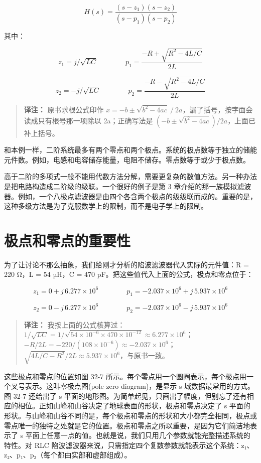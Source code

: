 \[H(s) = \frac{(s - z_1)(s - z_2)}{(s - p_1)(s - p_2)}\]

其中：

\[z_1 = j/\sqrt{LC} \qquad\qquad p_1 = \frac{-R + \sqrt{R^2 - 4L/C}}{2L}\]

\[z_2 = -j/\sqrt{LC} \qquad\qquad p_2 = \frac{-R - \sqrt{R^2 - 4L/C}}{2L}\]

\begin{quote}
\textbf{译注：} 原书求根公式印作
\(x = -b \pm \sqrt{b^2 - 4ac}\ /\ 2a\)，漏了括号，按字面会读成只有根号那一项除以
2a；正确写法是 \((-b \pm \sqrt{b^2-4ac})/2a\)，上面已补上括号。
\end{quote}

和本例一样，二阶系统最多有两个零点和两个极点。系统的极点数等于独立的储能元件数。例如，电感和电容储存能量，电阻不储存。零点数等于或少于极点数。

高于二阶的多项式一般不能用代数方法分解，需要更复杂的数值方法。另一种办法是把电路构造成二阶级的级联。一个很好的例子是第
3
章介绍的那一族模拟滤波器。例如，一个八极点滤波器是由四个各含两个极点的级级联而成的。重要的是，这种多级方法是为了克服数学上的限制，而不是电子学上的限制。

\section{极点和零点的重要性}

为了让讨论不那么抽象，我们给刚才分析的陷波滤波器代入实际的元件值：R =
220 Ω，L = 54 µH，C = 470 pF。把这些值代入上面的公式，极点和零点位于：

\[z_1 = 0 + j\,6.277\times 10^6 \qquad\qquad p_1 = -2.037\times 10^6 + j\,5.937\times 10^6\]

\[z_2 = 0 - j\,6.277\times 10^6 \qquad\qquad p_2 = -2.037\times 10^6 - j\,5.937\times 10^6\]

\begin{quote}
\textbf{译注：}
我按上面的公式核算过：\(1/\sqrt{LC} = 1/\sqrt{54\times10^{-6}\times 470\times10^{-12}} \approx 6.277\times10^6\)；\(-R/2L = -220/(108\times10^{-6}) \approx -2.037\times10^6\)；\(\sqrt{4L/C - R^2}/2L \approx 5.937\times10^6\)，与原书一致。
\end{quote}

这些极点和零点的位置如图 32-7
所示。每个零点用一个圆圈表示，每个极点用一个叉号表示。这叫零极点图(pole-zero
diagram)，是显示 s 域数据最常用的方式。图 32-7 还给出了 s
平面的地形图。为简单起见，只画出了幅度，但别忘了还有相应的相位。正如山峰和山谷决定了地球表面的形状，极点和零点决定了
s
平面的形状。与山峰和山谷不同的是，每个极点和零点的形状和大小都完全相同，极点或零点唯一的独特之处就是它的位置。极点和零点之所以重要，是因为它们简洁地表示了
s
平面上任意一点的值。也就是说，我们只用几个参数就能完整描述系统的特性。对
RLC
陷波滤波器来说，只需指定四个复数参数就能表示这个系统：z₁、z₂、p₁、p₂（每个都由实部和虚部组成）。

